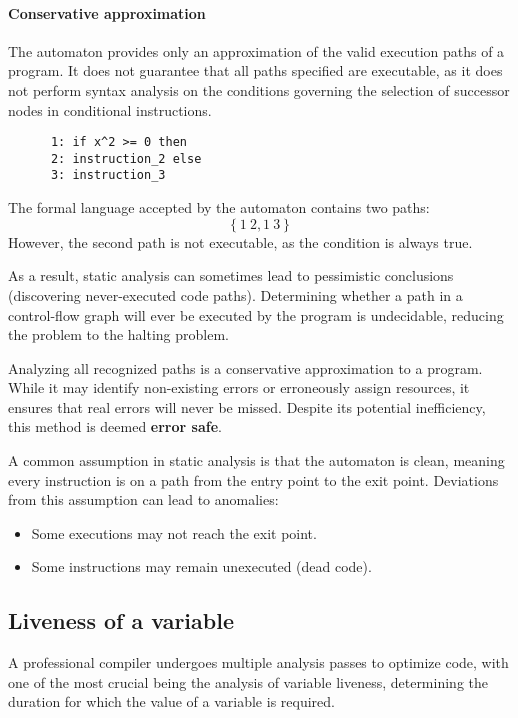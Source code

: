 \paragraph*{Conservative approximation}
The automaton provides only an approximation of the valid execution paths of a program. 
It does not guarantee that all paths specified are executable, as it does not perform syntax analysis on the conditions governing the selection of successor nodes in conditional instructions.
\begin{example}
    \begin{verbatim}
      1: if x^2 >= 0 then
      2: instruction_2 else
      3: instruction_3
    \end{verbatim}
    The formal language accepted by the automaton contains two paths:
    \[ \left\{ 1 \: 2,  1 \: 3 \right\} \]
    However, the second path is not executable, as the condition is always true.
\end{example}
As a result, static analysis can sometimes lead to pessimistic conclusions (discovering never-executed code paths). 
Determining whether a path in a control-flow graph will ever be executed by the program is undecidable, reducing the problem to the halting problem.

Analyzing all recognized paths is a conservative approximation to a program. 
While it may identify non-existing errors or erroneously assign resources, it ensures that real errors will never be missed. 
Despite its potential inefficiency, this method is deemed \textbf{error safe}.

A common assumption in static analysis is that the automaton is clean, meaning every instruction is on a path from the entry point to the exit point. 
Deviations from this assumption can lead to anomalies:
\begin{itemize}
    \item Some executions may not reach the exit point.
    \item Some instructions may remain unexecuted (dead code).
\end{itemize}

\subsection{Liveness of a variable}
A professional compiler undergoes multiple analysis passes to optimize code, with one of the most crucial being the analysis of variable liveness, determining the duration for which the value of a variable is required.

